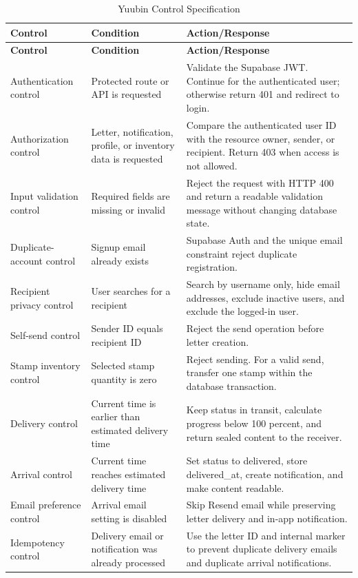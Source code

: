 ﻿\documentclass[12pt,a4paper]{report}
\begin{document}
\begin{longtable}{p{3.5cm} p{4.5cm} p{5.7cm}}
\caption{Yuubin Control Specification}
\label{tab:control_specification}\\
\toprule
\textbf{Control} & \textbf{Condition} & \textbf{Action/Response} \\
\midrule
\endfirsthead
\toprule
\textbf{Control} & \textbf{Condition} & \textbf{Action/Response} \\
\midrule
\endhead
Authentication control & Protected route or API is requested & Validate the Supabase JWT. Continue for the authenticated user; otherwise return 401 and redirect to login. \\
Authorization control & Letter, notification, profile, or inventory data is requested & Compare the authenticated user ID with the resource owner, sender, or recipient. Return 403 when access is not allowed. \\
Input validation control & Required fields are missing or invalid & Reject the request with HTTP 400 and return a readable validation message without changing database state. \\
Duplicate-account control & Signup email already exists & Supabase Auth and the unique email constraint reject duplicate registration. \\
Recipient privacy control & User searches for a recipient & Search by username only, hide email addresses, exclude inactive users, and exclude the logged-in user. \\
Self-send control & Sender ID equals recipient ID & Reject the send operation before letter creation. \\
Stamp inventory control & Selected stamp quantity is zero & Reject sending. For a valid send, transfer one stamp within the database transaction. \\
Delivery control & Current time is earlier than estimated delivery time & Keep status in transit, calculate progress below 100 percent, and return sealed content to the receiver. \\
Arrival control & Current time reaches estimated delivery time & Set status to delivered, store delivered\_at, create notification, and make content readable. \\
Email preference control & Arrival email setting is disabled & Skip Resend email while preserving letter delivery and in-app notification. \\
Idempotency control & Delivery email or notification was already processed & Use the letter ID and internal marker to prevent duplicate delivery emails and duplicate arrival notifications. \\

\end{longtable}
\end{document}
